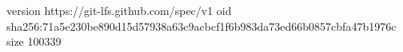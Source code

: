 version https://git-lfs.github.com/spec/v1
oid sha256:71a5e230be890d15d57938a63c9acbcf1f6b983da73ed66b0857cbfa47b1976c
size 100339

